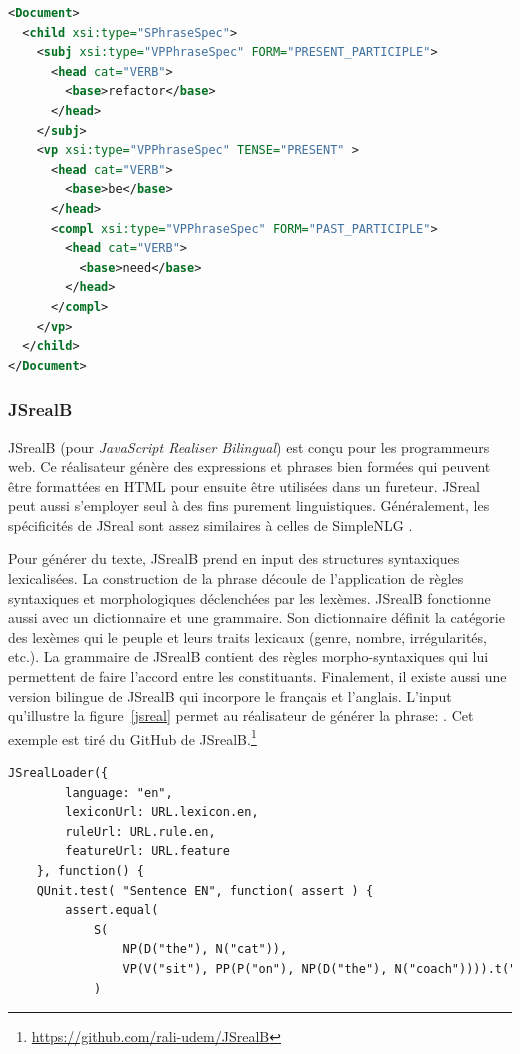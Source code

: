 \begin{lstlisting}[language=Xml, caption=Structure d'input dans SimpleNLG, label=simplenlg]
<Document>
  <child xsi:type="SPhraseSpec">
    <subj xsi:type="VPPhraseSpec" FORM="PRESENT_PARTICIPLE">
      <head cat="VERB">
        <base>refactor</base>
      </head>
    </subj>
    <vp xsi:type="VPPhraseSpec" TENSE="PRESENT" >
      <head cat="VERB">
        <base>be</base>
      </head>
      <compl xsi:type="VPPhraseSpec" FORM="PAST_PARTICIPLE">
        <head cat="VERB">
          <base>need</base>
        </head>
      </compl>
    </vp>
  </child>
</Document>
\end{lstlisting}

\subsubsection{JSrealB}
JSrealB (pour \emph{JavaScript Realiser Bilingual}) \citep{DBLP:conf/enlg/MolinsL15} est conçu pour les programmeurs web. Ce réalisateur génère des expressions et phrases bien formées qui peuvent être formattées en HTML pour ensuite être utilisées dans un fureteur. JSreal peut aussi s'employer seul à des fins purement linguistiques. Généralement, les spécificités de JSreal sont assez similaires à celles de SimpleNLG \citep{GattSimpleNLGRealisationEngine2009}.

Pour générer du texte, JSrealB prend en input des structures syntaxiques lexicalisées. La construction de la phrase découle de l'application de règles syntaxiques et morphologiques déclenchées par les lexèmes. JSrealB fonctionne aussi avec un dictionnaire et une grammaire. Son dictionnaire définit la catégorie des lexèmes qui le peuple et leurs traits lexicaux (genre, nombre, irrégularités, etc.). La grammaire de JSrealB contient des règles morpho-syntaxiques qui lui permettent de faire l'accord entre les constituants. Finalement, il existe aussi une version bilingue de JSrealB \citep{MolinsJSrealBBilingualText2015} qui incorpore le français et l'anglais. L'input qu'illustre la figure~\ref{jsreal} permet au réalisateur de générer la phrase: . Cet exemple est tiré du GitHub de JSrealB.\footnote{\url{https://github.com/rali-udem/JSrealB}}

\begin{lstlisting}[language=Xml, caption=JSreal, label=jsreal]
JSrealLoader({
        language: "en",
        lexiconUrl: URL.lexicon.en,
        ruleUrl: URL.rule.en,
        featureUrl: URL.feature
    }, function() {
    QUnit.test( "Sentence EN", function( assert ) {
        assert.equal(
            S(
                NP(D("the"), N("cat")),
                VP(V("sit"), PP(P("on"), NP(D("the"), N("coach")))).t("ps")
            )
\end{lstlisting}
		
